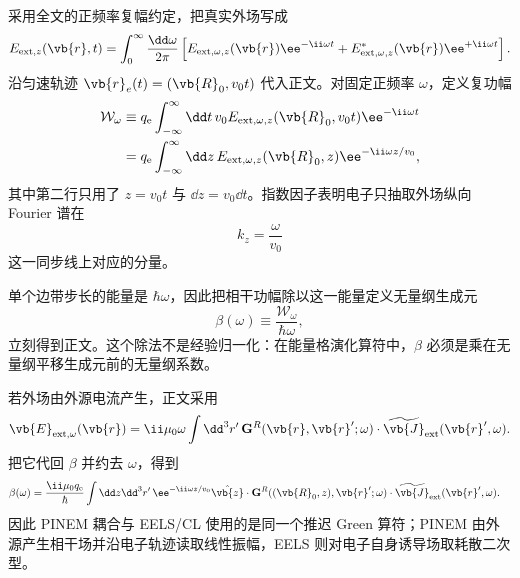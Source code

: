 \begin{derivation}[外场做功与近场复耦合]
采用全文的正频率复幅约定，把真实外场写成
\[
E_{{\rm ext},z}(\vb{r},t)
=\int_0^\infty\frac{\dd\omega}{2\pi}
\left[
E_{{\rm ext},\omega,z}(\vb{r})\ee^{-\ii\omega t}
+E_{{\rm ext},\omega,z}^*(\vb{r})\ee^{+\ii\omega t}
\right].
\]
沿匀速轨迹 $\vb{r}_e(t)=(\vb{R}_0,v_0t)$ 代入正文。对固定正频率 $\omega$，定义复功幅
\begin{align*}
\mathcal W_\omega
&\equiv
q_{\mathrm e}\int_{-\infty}^{\infty}\dd t\,
 v_0 E_{{\rm ext},\omega,z}(\vb{R}_0,v_0t)
 \ee^{-\ii\omega t}\\
&=q_{\mathrm e}\int_{-\infty}^{\infty}\dd z\,
 E_{{\rm ext},\omega,z}(\vb{R}_0,z)
 \ee^{-\ii\omega z/v_0},
\end{align*}
其中第二行只用了 $z=v_0t$ 与 $\dd z=v_0\dd t$。指数因子表明电子只抽取外场纵向 Fourier 谱在
\[
k_z=\frac{\omega}{v_0}
\]
这一同步线上对应的分量。

单个边带步长的能量是 $\hbar\omega$，因此把相干功幅除以这一能量定义无量纲生成元
\[
\beta(\omega)\equiv\frac{\mathcal W_\omega}{\hbar\omega},
\]
立刻得到正文。这个除法不是经验归一化：在能量格演化算符中，$\beta$ 必须是乘在无量纲平移生成元前的无量纲系数。

若外场由外源电流产生，正文采用
\[
\vb{E}_{{\rm ext},\omega}(\vb{r})
=\ii\mu_0\omega
\int\dd^3r'\,
\mathbf G^R(\vb{r},\vb{r}';\omega)
\cdot\widetilde{\vb{J}}_{\rm ext}(\vb{r}',\omega).
\]
把它代回 $\beta$ 并约去 $\omega$，得到
\begin{align*}
\beta(\omega)
={}&\frac{\ii\mu_0q_{\mathrm e}}{\hbar}
\int\dd z\dd^3r'\,
 \ee^{-\ii\omega z/v_0}
\hat{\vb{z}}\cdot
\mathbf G^R((\vb{R}_0,z),\vb{r}';\omega)
\cdot\widetilde{\vb{J}}_{\rm ext}(\vb{r}',\omega).
\end{align*}
因此 PINEM 耦合与 EELS/CL 使用的是同一个推迟 Green 算符；PINEM 由外源产生相干场并沿电子轨迹读取线性振幅，EELS 则对电子自身诱导场取耗散二次型。
\end{derivation}
